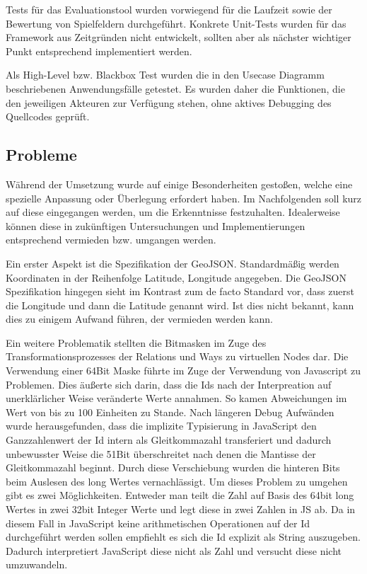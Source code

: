 Tests für das Evaluationstool wurden vorwiegend für die Laufzeit sowie der Bewertung von Spielfeldern durchgeführt.
Konkrete Unit-Tests wurden für das Framework aus Zeitgründen nicht entwickelt, sollten aber als nächster wichtiger Punkt entsprechend implementiert werden.

Als High-Level bzw. Blackbox Test wurden die in den Usecase Diagramm beschriebenen Anwendungsfälle getestet. Es wurden daher die Funktionen, die den jeweiligen Akteuren zur Verfügung stehen, ohne aktives Debugging des Quellcodes geprüft.

\subsection*{Probleme}

Während der Umsetzung wurde auf einige Besonderheiten gestoßen, welche eine spezielle Anpassung oder Überlegung erfordert haben. Im Nachfolgenden soll kurz auf diese eingegangen werden, um die Erkenntnisse festzuhalten. Idealerweise können diese in zukünftigen Untersuchungen und Implementierungen entsprechend vermieden bzw. umgangen werden.

Ein erster Aspekt ist die Spezifikation der GeoJSON. Standardmäßig werden Koordinaten in der Reihenfolge Latitude, Longitude angegeben.\cite{Schoeneberger.2002,Barzegar.1996,Maling.1991,}
Die GeoJSON Spezifikation hingegen sieht im Kontrast zum de facto Standard vor, dass zuerst die Longitude und dann die Latitude genannt wird.\cite{Butler.2008} Ist dies nicht bekannt, kann dies zu einigem Aufwand führen, der vermieden werden kann.

Ein weitere Problematik stellten die Bitmasken im Zuge des Transformationsprozesses der Relations und Ways zu virtuellen Nodes dar. Die Verwendung einer 64Bit Maske führte im Zuge der Verwendung von Javascript zu Problemen. Dies äußerte sich darin, dass die Ids nach der Interpreation auf unerklärlicher Weise veränderte Werte annahmen. So kamen Abweichungen im Wert von bis zu 100 Einheiten zu Stande. Nach längeren Debug Aufwänden wurde herausgefunden, dass die implizite Typisierung in JavaScript den Ganzzahlenwert der Id intern als Gleitkommazahl transferiert und dadurch unbewusster Weise die 51Bit überschreitet nach denen die Mantisse der Gleitkommazahl beginnt. Durch diese Verschiebung wurden die hinteren Bits beim Auslesen des long Wertes vernachlässigt. Um dieses Problem zu umgehen gibt es zwei Möglichkeiten. Entweder man teilt die Zahl auf Basis des 64bit long Wertes in zwei 32bit Integer Werte und legt diese in zwei Zahlen in JS ab. Da in diesem Fall in JavaScript keine arithmetischen Operationen auf der Id durchgeführt werden sollen empfiehlt es sich die Id explizit als String auszugeben. Dadurch interpretiert JavaScript diese nicht als Zahl und versucht diese nicht umzuwandeln.

